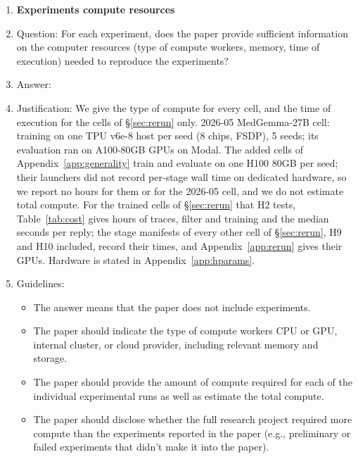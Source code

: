 \begin{enumerate}
\begin{itemize}
        \item It is OK to report 1-sigma error bars, but one should state it. The authors should preferably report a 2-sigma error bar than state that they have a 96\% CI, if the hypothesis of Normality of errors is not verified.
        \item For asymmetric distributions, the authors should be careful not to show in tables or figures symmetric error bars that would yield results that are out of range (e.g., negative error rates).
        \item If error bars are reported in tables or plots, the authors should explain in the text how they were calculated and reference the corresponding figures or tables in the text.
    \end{itemize}

\item {\bf Experiments compute resources}
    \item[] Question: For each experiment, does the paper provide sufficient information on the computer resources (type of compute workers, memory, time of execution) needed to reproduce the experiments?
    \item[] Answer: \answerNo{}
    \item[] Justification: We give the type of compute for every cell, and the time of execution for the cells of \S\ref{sec:rerun} only. 2026-05 MedGemma-27B cell: training on one TPU v6e-8 host per seed (8 chips, FSDP), 5 seeds; its evaluation ran on A100-80GB GPUs on Modal. The added cells of Appendix~\ref{app:generality} train and evaluate on one H100 80GB per seed; their launchers did not record per-stage wall time on dedicated hardware, so we report no hours for them or for the 2026-05 cell, and we do not estimate total compute. For the trained cells of \S\ref{sec:rerun} that H2 tests, Table~\ref{tab:cost} gives hours of traces, filter and training and the median seconds per reply; the stage manifests of every other cell of \S\ref{sec:rerun}, H9 and H10 included, record their times, and Appendix~\ref{app:rerun} gives their GPUs. Hardware is stated in Appendix~\ref{app:hparams}.
    \item[] Guidelines:
    \begin{itemize}
        \item The answer \answerNA{} means that the paper does not include experiments.
        \item The paper should indicate the type of compute workers CPU or GPU, internal cluster, or cloud provider, including relevant memory and storage.
        \item The paper should provide the amount of compute required for each of the individual experimental runs as well as estimate the total compute.
        \item The paper should disclose whether the full research project required more compute than the experiments reported in the paper (e.g., preliminary or failed experiments that didn't make it into the paper).
    \end{itemize}


\end{enumerate}
